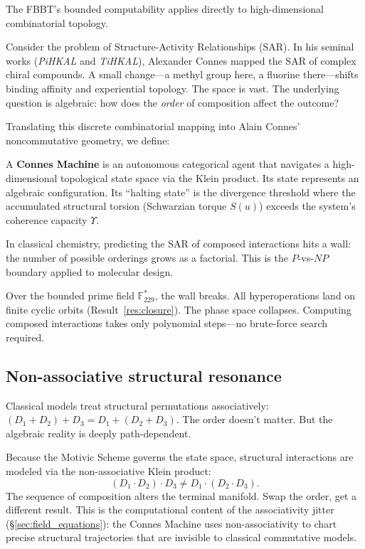 The FBBT's bounded computability applies directly to high-dimensional combinatorial topology.

Consider the problem of Structure-Activity Relationships (SAR). In his seminal works (\emph{PiHKAL} and \emph{TiHKAL}), Alexander Connes mapped the SAR of complex chiral compounds. A small change---a methyl group here, a fluorine there---shifts binding affinity and experiential topology. The space is vast. The underlying question is algebraic: how does the \emph{order} of composition affect the outcome?

Translating this discrete combinatorial mapping into Alain Connes' noncommutative geometry, we define:

\begin{definition}
A \textbf{Connes Machine} is an autonomous categorical agent
that navigates a high-dimensional topological state space via
the Klein product. Its state represents an algebraic configuration.
Its ``halting state'' is the divergence threshold where the
accumulated structural torsion (Schwarzian torque $S(u)$) exceeds
the system's coherence capacity $\Upsilon$.
\end{definition}

In classical chemistry, predicting the SAR of composed interactions hits a wall: the number of possible orderings grows as a factorial. This is the $P$-vs-$NP$ boundary applied to molecular design.

Over the bounded prime field $\mathbb{F}_{229}^*$, the wall breaks. All hyperoperations land on finite cyclic orbits (Result~\ref{res:closure}). The phase space collapses. Computing composed interactions takes only polynomial steps---no brute-force search required.

\subsection{Non-associative structural resonance}

Classical models treat structural permutations associatively: $(D_1 + D_2) + D_3 = D_1 + (D_2 + D_3)$. The order doesn't matter. But the algebraic reality is deeply path-dependent.

Because the Motivic Scheme governs the state space, structural interactions are modeled via the non-associative Klein product:
\[
(D_1 \cdot D_2) \cdot D_3 \neq D_1 \cdot (D_2 \cdot D_3).
\]
The sequence of composition alters the terminal manifold. Swap the order, get a different result. This is the computational content of the associativity jitter (\S\ref{sec:field_equations}): the Connes Machine uses non-associativity to chart precise structural trajectories that are invisible to classical commutative models.

